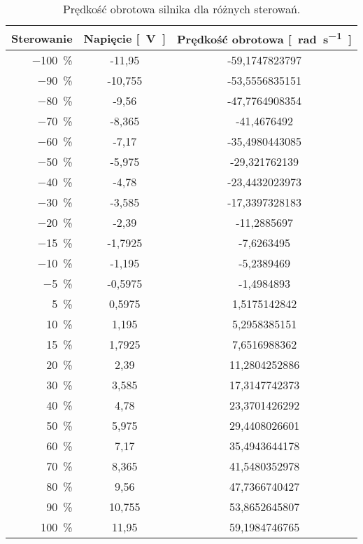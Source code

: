 \begin{table}[H]
    \centering
    \begin{threeparttable}
        \caption{Prędkość obrotowa silnika dla różnych sterowań.}
        \label{tab:predkosc_silnika_rozne_sterowania}
        
        \begin{tabularx}{0.59\textwidth}{r | S[round-mode=places, round-precision=3] | S[round-mode=places, round-precision=2]}
            \toprule
            {Sterowanie} & {Napięcie \si{[\volt]}} & {Prędkość obrotowa \si{[\radian\per\second]}} \\
            \midrule
            \SI{-100}{\percent} & -11,95 & -59,1747823797 \\
            \SI{-90}{\percent} & -10,755 & -53,5556835151 \\
            \SI{-80}{\percent} & -9,56 & -47,7764908354 \\
            \SI{-70}{\percent} & -8,365 & -41,4676492 \\
            \SI{-60}{\percent} & -7,17 & -35,4980443085 \\
            \SI{-50}{\percent} & -5,975 & -29,321762139 \\
            \SI{-40}{\percent} & -4,78 & -23,4432023973 \\
            \SI{-30}{\percent} & -3,585 & -17,3397328183 \\
            \SI{-20}{\percent} & -2,39 & -11,2885697 \\
            \SI{-15}{\percent} & -1,7925 & -7,6263495 \\
            \SI{-10}{\percent} & -1,195 & -5,2389469 \\
            \SI{-5}{\percent} & -0,5975 & -1,4984893 \\
            \SI{5}{\percent} & 0,5975 & 1,5175142842 \\
            \SI{10}{\percent} & 1,195 & 5,2958385151 \\
            \SI{15}{\percent} & 1,7925 & 7,6516988362 \\
            \SI{20}{\percent} & 2,39 & 11,2804252886 \\
            \SI{30}{\percent} & 3,585 & 17,3147742373 \\
            \SI{40}{\percent} & 4,78 & 23,3701426292 \\
            \SI{50}{\percent} & 5,975 & 29,4408026601 \\
            \SI{60}{\percent} & 7,17 & 35,4943644178 \\
            \SI{70}{\percent} & 8,365 & 41,5480352978 \\
            \SI{80}{\percent} & 9,56 & 47,7366740427 \\
            \SI{90}{\percent} & 10,755 & 53,8652645807 \\
            \SI{100}{\percent} & 11,95 & 59,1984746765 \\
            \bottomrule
        \end{tabularx}
        

\end{threeparttable}
\end{table}
